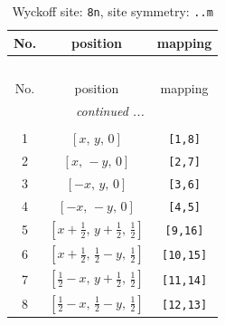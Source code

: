 \documentclass[fleqn,8pt]{jsarticle}
\begin{document}
\begin{longtable}{ccc}
\caption{Wyckoff site: {\tt 8n}, site symmetry: {\tt ..m}}
 \\
 \hline \hline
No. & position & mapping \\ \hline \endfirsthead

\multicolumn{2}{l}{\tablename\ \thetable{}} \\
 \hline \hline
No. & position & mapping \\ \hline \endhead

 \hline \hline
\multicolumn{2}{r}{\footnotesize\it continued ...} \\ \endfoot

 \hline \hline
\multicolumn{2}{r}{} \\ \endlastfoot

1 & $\left[ x,\, y,\, 0 \right]$ & {\tt [1,8]} \\ \hline
2 & $\left[ x,\, - y,\, 0 \right]$ & {\tt [2,7]} \\ \hline
3 & $\left[ - x,\, y,\, 0 \right]$ & {\tt [3,6]} \\ \hline
4 & $\left[ - x,\, - y,\, 0 \right]$ & {\tt [4,5]} \\ \hline
5 & $\left[ x + \frac{1}{2},\, y + \frac{1}{2},\, \frac{1}{2} \right]$ & {\tt [9,16]} \\ \hline
6 & $\left[ x + \frac{1}{2},\, \frac{1}{2} - y,\, \frac{1}{2} \right]$ & {\tt [10,15]} \\ \hline
7 & $\left[ \frac{1}{2} - x,\, y + \frac{1}{2},\, \frac{1}{2} \right]$ & {\tt [11,14]} \\ \hline
8 & $\left[ \frac{1}{2} - x,\, \frac{1}{2} - y,\, \frac{1}{2} \right]$ & {\tt [12,13]} \\
\end{longtable}
\renewcommand{\arraystretch}{1.2}
\end{document}
